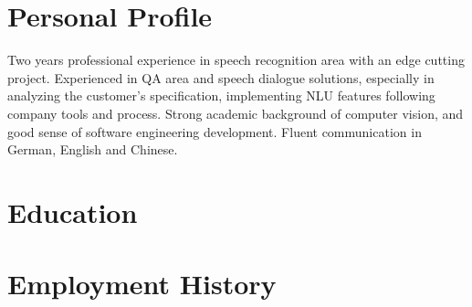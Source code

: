 \documentclass[10pt]{article} %
\begin{document}

\section{Personal Profile}

Two years professional experience in speech recognition area with an edge cutting project. Experienced in QA area and speech dialogue solutions, especially in analyzing the customer's specification, implementing NLU features following company tools and process. Strong academic background of computer vision, and good sense of software engineering development. Fluent communication in German, English and Chinese. 


\section{Education}





\section{Employment History}
\end{document}
